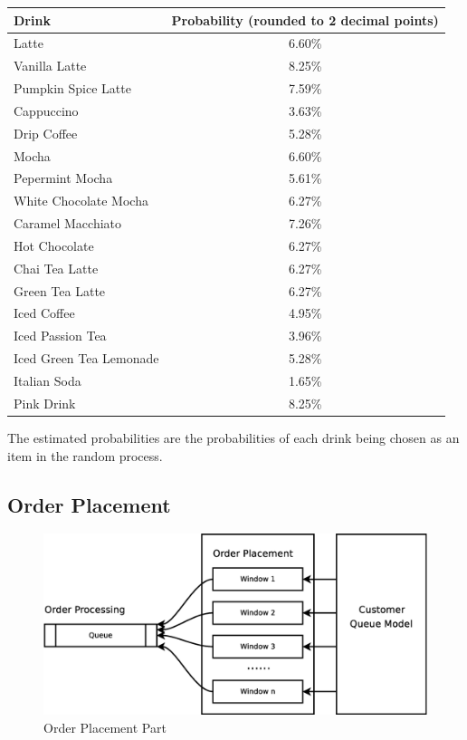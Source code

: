 \documentclass[a4paper]{article}
\begin{document}
\begin{center}
    \begin{tabular}{ l | c }
    	Drink & Probability (rounded to 2 decimal points) \\
        \hline
		Latte & 6.60\% \\
		Vanilla Latte & 8.25\% \\
		Pumpkin Spice Latte & 7.59\% \\
		Cappuccino & 3.63\% \\
		Drip Coffee & 5.28\% \\
		Mocha & 6.60\% \\
		Pepermint Mocha & 5.61\% \\
		White Chocolate Mocha & 6.27\% \\
		Caramel Macchiato & 7.26\% \\
		Hot Chocolate & 6.27\% \\
		Chai Tea Latte & 6.27\% \\
		Green Tea Latte & 6.27\% \\
		Iced Coffee & 4.95\% \\
		Iced Passion Tea & 3.96\% \\
		Iced Green Tea Lemonade & 5.28\% \\
		Italian Soda & 1.65\% \\
		Pink Drink & 8.25\%
    \end{tabular}
\end{center}

The estimated probabilities are the probabilities of each drink being chosen as an item in the random process.

\subsection{Order Placement}

\begin{figure}[H]
	\centering
	\includegraphics[width=0.50\textheight]{order_placement}
	\caption{Order Placement Part}
\end{figure}
\end{document}
